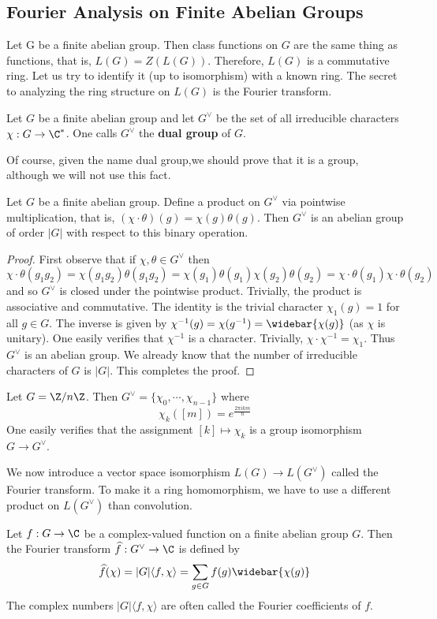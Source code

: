 \subsection{Fourier Analysis on Finite Abelian Groups}
Let G be a finite abelian group. Then class functions on $G$ are the same thing as functions, that is, $L(G)=Z(L(G))$. Therefore, $L(G)$ is a commutative ring. Let us try to identify it (up to isomorphism) with a known ring. The secret to analyzing the ring structure on $L(G)$ is the Fourier transform.
\begin{definition}
Let $G$ be a finite abelian group and let $G^\vee$ be the set of all irreducible characters $\chi:G\to\C^*$. One calls $G^{\vee}$ the \textbf{dual group} of $G$.
\end{definition}
Of course, given the name dual group,we should prove that it is a group, although we will not use this fact.
\begin{proposition}
Let $G$ be a finite abelian group. Define a product on $G^\vee$ via pointwise multiplication, that is, $(\chi\cdot\theta)(g)=\chi(g)\theta(g)$. Then $G^\vee$ is an abelian group of order $|G|$ with respect to this binary operation.
\end{proposition}
\begin{proof}
First observe that if $\chi,\theta\in G^\vee$ then
\[\chi\cdot\theta(g_1g_2)=\chi(g_1g_2)\theta(g_1g_2)=\chi(g_1)\theta(g_1)\chi(g_2)\theta(g_2)=\chi\cdot\theta(g_1)\chi\cdot\theta(g_2)\]
and so $G^\vee$ is closed under the pointwise product. Trivially, the product is associative and commutative. The identity is the trivial character $\chi_1(g)=1$ for all $g\in G$. The inverse is given by $\chi^{-1}(g)=\chi(g^{-1})=\widebar{\chi(g)}$ (as $\chi$ is unitary). One easily verifies that $\chi^{-1}$ is a character. Trivially, $\chi\cdot\chi^{-1}=\chi_1$. Thus $G^\vee$ is an abelian group. We already know that the number of irreducible characters of $G$ is $|G|$. This completes the proof.
\end{proof}
\begin{example}
Let $G=\Z/n\Z$. Then $G^\vee=\{\chi_0,\cdots,\chi_{n-1}\}$ where
\[\chi_k([m])=e^{\frac{2\pi ikm}{n}}\]
One easily verifies that the assignment $[k]\mapsto\chi_k$ is a group isomorphism $G\to G^\vee$.
\end{example}
We now introduce a vector space isomorphism $L(G)\to L(G^\vee)$ called the Fourier transform. To make it a ring homomorphism, we have to use a different product on $L(G^\vee)$ than convolution.
\begin{definition}
Let $f:G\to\C$ be a complex-valued function on a finite abelian group $G$. Then the Fourier transform $\widehat{f}:G^\vee\to\C$ is defined by
\[\widehat{f}(\chi)=|G|\langle f,\chi\rangle=\sum_{g\in G}f(g)\widebar{\chi(g)}\]
The complex numbers $|G|\langle f,\chi\rangle$ are often called the Fourier coefficients of $f$.
\end{definition}
